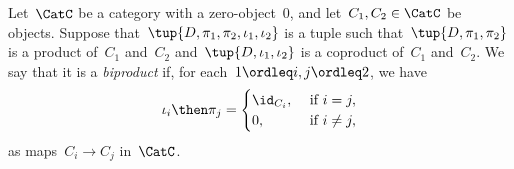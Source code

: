 \begin{ctdefinition}[Biproduct]
Let~$\CatC$ be a category with a zero-object~$0$, and let~$C_1,C_2\in\CatC$ be objects. Suppose that~$\tup{D,\pi_1,\pi_2,\iota_1,\iota_2}$ is a tuple such that~$\tup{D,\pi_1,\pi_2}$ is a product of~$C_1$ and~$C_2$ and~$\tup{D,\iota_1,\iota_2}$ is a coproduct of~$C_1$ and~$C_2$. We say that it is a \emph{biproduct} if, for each~$1\ordleq i,j\ordleq 2$, we have
\begin{equation}
\iota_i\then \pi_j=
\begin{cases}
	\id_{C_i}, &\text{ if }i=j,\\
	0, &\text{ if }i\neq j,
\end{cases} \label{eq:biproduct-condition}
\end{equation}
as maps~$C_i\to C_j$ in~$\CatC$.
\end{ctdefinition}


